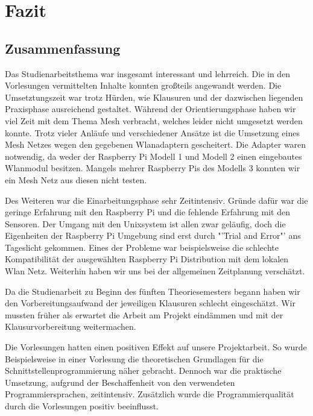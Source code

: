 \chapter{Fazit}
%
\section{Zusammenfassung}
	Das Studienarbeitsthema war insgesamt interessant und lehrreich. Die in den Vorlesungen vermittelten Inhalte konnten großteils angewandt werden. Die Umsetztungszeit war trotz Hürden, wie Klausuren und der dazwischen liegenden Praxisphase ausreichend gestaltet. Während der Orientierungsphase haben wir viel Zeit mit dem Thema Mesh verbracht, welches leider nicht umgesetzt werden konnte. Trotz vieler Anläufe und verschiedener Ansätze ist die Umsetzung eines Mesh Netzes wegen den gegebenen Wlanadaptern gescheitert. Die Adapter waren notwendig, da weder der Raspberry Pi Modell 1 und Modell 2 einen eingebautes Wlanmodul besitzen. Mangels mehrer Raspberry Pis des Modells 3 konnten wir ein Mesh Netz aus diesen nicht testen. 
	
	Des Weiteren war die Einarbeitungsphase sehr Zeitintensiv. Gründe dafür war die geringe Erfahrung mit den Raspberry Pi und die fehlende Erfahrung mit den Sensoren. Der Umgang mit den Unixsystem ist allen zwar geläufig, doch die Eigenheiten der Raspberry Pi Umgebung sind erst durch "'Trial and Error"' ans Tageslicht gekommen. Eines der Probleme war beispielsweise die schlechte Kompatibilität der ausgewählten Raspberry Pi Distribution mit dem lokalen Wlan Netz. Weiterhin haben wir uns bei der allgemeinen Zeitplanung verschätzt. 
	
	Da die Studienarbeit zu Beginn des fünften Theoriesemesters begann haben wir den Vorbereitungsaufwand der jeweiligen Klausuren schlecht eingeschätzt. Wir mussten früher als erwartet die Arbeit am Projekt eindämmen und mit der Klausurvorbereitung weitermachen. 
	
	Die Vorlesungen hatten einen positiven Effekt auf unsere Projektarbeit. So wurde Beispielsweise in einer Vorlesung die theoretischen Grundlagen für die Schnittstellenprogrammierung näher gebracht. Dennoch war die praktische Umsetzung, aufgrund der Beschaffenheit von den verwendeten Programmiersprachen, zeitintensiv. Zusätzlich wurde die Programmierqualität durch die Vorlesungen positiv beeinflusst.
	

